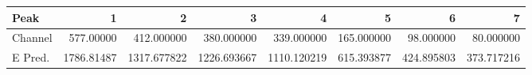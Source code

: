 \begin{tabular}{lrrrrrrr}
\toprule
Peak &           1 &            2 &            3 &            4 &           5 &           6 &           7 \\
\midrule
Channel &   577.00000 &   412.000000 &   380.000000 &   339.000000 &  165.000000 &   98.000000 &   80.000000 \\
E Pred. &  1786.81487 &  1317.677822 &  1226.693667 &  1110.120219 &  615.393877 &  424.895803 &  373.717216 \\
\bottomrule
\end{tabular}
